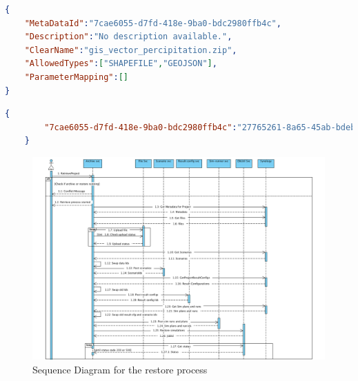\begin{lstlisting}[caption={Snippet of the archived MARS scenario resource}, language=json,firstnumber=1, captionpos=b, label={lst:marsScenario}]
{
    "MetaDataId":"7cae6055-d7fd-418e-9ba0-bdc2980ffb4c",
    "Description":"No description available.",
    "ClearName":"gis_vector_percipitation.zip",
    "AllowedTypes":["SHAPEFILE","GEOJSON"],
    "ParameterMapping":[]
}
\end{lstlisting}

\begin{lstlisting}[caption={The mapped key value attributes that the scenario metadata would need}, language=json,firstnumber=1, captionpos=b, label={lst:marsMap}]
    {
        "7cae6055-d7fd-418e-9ba0-bdc2980ffb4c":"27765261-8a65-45ab-bdeb-db8b5b7f8f4"
    }
    \end{lstlisting}

\begin{figure}[H]
    \centering \includegraphics[scale=0.5, angle=90, origin=c]{grafiken/sequenceRestore.png}
    \caption{Sequence Diagram for the restore process}
    \label{fig:sequenceRestore}
\end{figure}
    
